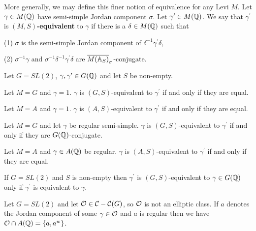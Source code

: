 More generally, we may define this
finer notion of equivalence for any Levi $M$. Let
$\gamma \in M({\Bbb{Q}})$ have semi-simple Jordan
component $\sigma$. Let $\gamma ^{\prime }\in M({\Bbb{Q}})$.
We say that $\gamma ^{\prime }$
is $(M,S)${\bf -equivalent} to $\gamma $ if there is a
$\delta \in M({\Bbb{Q}})$ such that

(1) $\sigma $ is the semi-simple Jordan component of
$\delta ^{-1}\gamma^{\prime }\delta $,

(2) $\sigma ^{-1}\gamma $ and $\sigma ^{-1}\delta ^{-1}
\gamma ^{\prime}\delta $ are
$\overline{M({\Bbb{A}}_{S})}_\sigma$-conjugate.

\begin{example}
Let $G=SL(2)$, $\gamma,\gamma^{\prime}\in G({\Bbb{Q}})$
and let $S$ be non-empty.

Let $M=G$ and $\gamma =1$. $\gamma$ is $(G,S)$-equivalent to
$\gamma^{\prime}$ if and only if they are equal.

Let $M=A$ and $\gamma =1$. $\gamma$ is $(A,S)$-equivalent to
$\gamma^{\prime}$ if and only if they are equal.

Let $M=G$ and let $\gamma $ be regular semi-simple.
$\gamma$ is $(G,S)$-equivalent to
$\gamma^{\prime}$ if and only if they are $G({\Bbb{Q}})$-conjugate.

Let $M=A$ and $\gamma \in A({\Bbb{Q}})$ be regular.
$\gamma$ is $(A,S)$-equivalent to
$\gamma^{\prime}$ if and only if they are equal.
\end{example}

\begin{lemma}
If $G=SL(2)$ and $S$ is non-empty then
$\gamma^{\prime}$ is $(G,S)$-equivalent to $\gamma\in G({\Bbb{Q}})$ only if 
$\gamma^{\prime}$ is equivalent to $\gamma$.
\end{lemma}

\begin{example}
Let $G=SL(2)$ and let ${\cal{O}}\in {\cal C}-{\cal C}(G)$, so
${\cal{O}}$ is not an elliptic class. If $a$ denotes the Jordan component of
some $\gamma \in {\cal{O}}$ and $a$ is regular then we have
${\cal{O}}\cap A({\Bbb{Q}})=\{a,a^w\}$.
\end{example}


